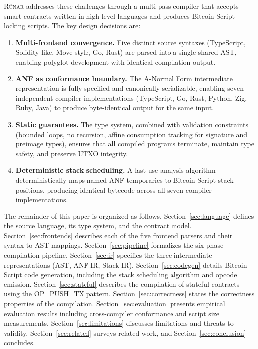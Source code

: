 \documentclass[11pt,a4paper]{article}
\newcommand{\runar}{\textsc{Rúnar}}
\begin{document}
\runar{} addresses these challenges through a multi-pass compiler that accepts
smart contracts written in high-level languages and produces Bitcoin Script
locking scripts. The key design decisions are:

\begin{enumerate}[label=(\roman*)]
  \item \textbf{Multi-frontend convergence.} Five distinct source syntaxes
    (TypeScript, Solidity-like, Move-style, Go, Rust) are parsed into a
    single shared AST, enabling polyglot development with identical
    compilation output.
  \item \textbf{ANF as conformance boundary.} The A-Normal Form intermediate
    representation is fully specified and canonically serializable, enabling
    seven independent compiler implementations (TypeScript, Go, Rust, Python,
    Zig, Ruby, Java) to produce byte-identical output for the same input.
  \item \textbf{Static guarantees.} The type system, combined with validation
    constraints (bounded loops, no recursion, affine consumption tracking
    for signature and preimage types), ensures that all compiled programs
    terminate, maintain type safety, and preserve UTXO integrity.
  \item \textbf{Deterministic stack scheduling.} A last-use analysis algorithm
    deterministically maps named ANF temporaries to Bitcoin Script stack
    positions, producing identical bytecode across all seven compiler
    implementations.
\end{enumerate}

The remainder of this paper is organized as follows. Section~\ref{sec:language}
defines the source language, its type system, and the contract model.
Section~\ref{sec:frontends} describes each of the five frontend parsers and
their syntax-to-AST mappings. Section~\ref{sec:pipeline} formalizes the
six-phase compilation pipeline. Section~\ref{sec:ir} specifies the three
intermediate representations (AST, ANF IR, Stack IR).
Section~\ref{sec:codegen} details Bitcoin Script code generation, including
the stack scheduling algorithm and opcode emission.
Section~\ref{sec:stateful} describes the compilation of stateful contracts
using the OP\_PUSH\_TX pattern. Section~\ref{sec:correctness} states the
correctness properties of the compilation. Section~\ref{sec:evaluation}
presents empirical evaluation results including cross-compiler conformance
and script size measurements. Section~\ref{sec:limitations} discusses
limitations and threats to validity. Section~\ref{sec:related} surveys
related work, and Section~\ref{sec:conclusion} concludes.
\end{document}
